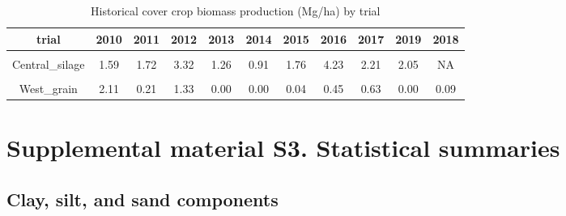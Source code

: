 \documentclass[
]{article}
\begin{document}
\begin{table}[H]

\caption{\label{tab:ccbio}Historical cover crop biomass production (Mg/ha) by trial}
\centering
\begin{tabular}[t]{ccccccccccc}
\toprule
trial & 2010 & 2011 & 2012 & 2013 & 2014 & 2015 & 2016 & 2017 & 2019 & 2018\\
\midrule
\cellcolor{gray!6}{Central\_grain} & \cellcolor{gray!6}{0.86} & \cellcolor{gray!6}{0.28} & \cellcolor{gray!6}{1.37} & \cellcolor{gray!6}{0.25} & \cellcolor{gray!6}{0.47} & \cellcolor{gray!6}{0.61} & \cellcolor{gray!6}{2.22} & \cellcolor{gray!6}{2.76} & \cellcolor{gray!6}{1.29} & \cellcolor{gray!6}{NA}\\
\cmidrule{1-11}
Central\_silage & 1.59 & 1.72 & 3.32 & 1.26 & 0.91 & 1.76 & 4.23 & 2.21 & 2.05 & NA\\
\cmidrule{1-11}
\cellcolor{gray!6}{East\_grain} & \cellcolor{gray!6}{2.11} & \cellcolor{gray!6}{1.46} & \cellcolor{gray!6}{0.00} & \cellcolor{gray!6}{0.92} & \cellcolor{gray!6}{0.00} & \cellcolor{gray!6}{0.36} & \cellcolor{gray!6}{0.51} & \cellcolor{gray!6}{7.30} & \cellcolor{gray!6}{0.30} & \cellcolor{gray!6}{0.19}\\
\cmidrule{1-11}
West\_grain & 2.11 & 0.21 & 1.33 & 0.00 & 0.00 & 0.04 & 0.45 & 0.63 & 0.00 & 0.09\\
\bottomrule
\end{tabular}
\end{table}

\newpage

\hypertarget{supplemental-material-s3.-statistical-summaries}{%
\section{Supplemental material S3. Statistical
summaries}\label{supplemental-material-s3.-statistical-summaries}}

\hypertarget{clay-silt-and-sand-components}{%
\subsection{Clay, silt, and sand
components}\label{clay-silt-and-sand-components}}
\end{document}
